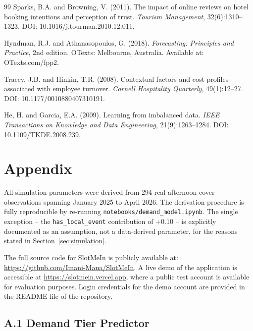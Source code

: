 \documentclass[12pt,a4paper,oneside]{article}
\begin{document}
\begin{thebibliography}{99}
Sparks, B.A. and Browning, V. (2011).
\newblock The impact of online reviews on hotel booking intentions and perception of trust.
\newblock \textit{Tourism Management}, 32(6):1310--1323.
\newblock DOI: 10.1016/j.tourman.2010.12.011.

Hyndman, R.J. and Athanasopoulos, G. (2018).
\newblock \textit{Forecasting: Principles and Practice}, 2nd edition.
\newblock OTexts: Melbourne, Australia.
\newblock Available at: OTexts.com/fpp2.

Tracey, J.B. and Hinkin, T.R. (2008).
\newblock Contextual factors and cost profiles associated with employee turnover.
\newblock \textit{Cornell Hospitality Quarterly}, 49(1):12--27.
\newblock DOI: 10.1177/0010880407310191.

He, H. and Garcia, E.A. (2009).
\newblock Learning from imbalanced data.
\newblock \textit{IEEE Transactions on Knowledge and Data Engineering}, 21(9):1263--1284.
\newblock DOI: 10.1109/TKDE.2008.239.

\end{thebibliography}

\newpage
\section*{Appendix}
\appendix

All simulation parameters were derived from 294 real afternoon cover observations spanning January 2025 to April 2026. The derivation procedure is fully reproducible by re-running \texttt{notebooks/demand\_model.ipynb}. The single exception -- the \texttt{has\_local\_event} contribution of $+0.10$ -- is explicitly documented as an assumption, not a data-derived parameter, for the reasons stated in Section~\ref{sec:simulation}.

\bigskip
The full source code for SlotMeIn is publicly available at: \url{https://github.com/Imani-Maua/SlotMeIn}. A live demo of the application is accessible at \url{https://slotmein.vercel.app}, where a public test account is available for evaluation purposes. Login credentials for the demo account are provided in the README file of the repository.

\subsection*{A.1 Demand Tier Predictor}
\end{document}
